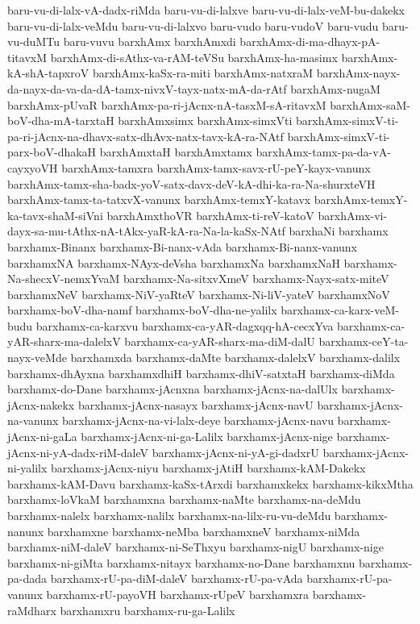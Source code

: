 {baru-vu-di-lalx-vA-dadx-riMda
baru-vu-di-lalxve
baru-vu-di-lalx-veM-bu-dakekx
baru-vu-di-lalx-veMdu
baru-vu-di-lalxvo
baru-vudo
baru-vudoV
baru-vudu
baru-vu-duMTu
baru-vuvu
barxhAmx
barxhAmxdi
barxhAmx-di-ma-dhayx-pA-titavxM
barxhAmx-di-sAthx-va-rAM-teVSu
barxhAmx-ha-masimx
barxhAmx-kA-shA-tapxroV
barxhAmx-kaSx-ra-miti
barxhAmx-natxraM
barxhAmx-nayx-da-nayx-da-va-da-dA-tamx-nivxV-tayx-natx-mA-da-rAtf
barxhAmx-nugaM
barxhAmx-pUvaR
barxhAmx-pa-ri-jAcnx-nA-tasxM-sA-ritavxM
barxhAmx-saM-boV-dha-mA-tarxtaH
barxhAmxsimx
barxhAmx-simxVti
barxhAmx-simxV-ti-pa-ri-jAcnx-na-dhavx-satx-dhAvx-natx-tavx-kA-ra-NAtf
barxhAmx-simxV-ti-parx-boV-dhakaH
barxhAmxtaH
barxhAmxtamx
barxhAmx-tamx-pa-da-vA-cayxyoVH
barxhAmx-tamxra
barxhAmx-tamx-savx-rU-peY-kayx-vanunx
barxhAmx-tamx-sha-badx-yoV-satx-davx-deV-kA-dhi-ka-ra-Na-shurxteVH
barxhAmx-tamx-ta-tatxvX-vanunx
barxhAmx-temxY-katavx
barxhAmx-temxY-ka-tavx-shaM-siVni
barxhAmxthoVR
barxhAmx-ti-reV-katoV
barxhAmx-vi-dayx-sa-mu-tAthx-nA-tAkx-yaR-kA-ra-Na-la-kaSx-NAtf
barxhaNi
barxhamx
barxhamx-Binanx
barxhamx-Bi-nanx-vAda
barxhamx-Bi-nanx-vanunx
barxhamxNA
barxhamx-NAyx-deVsha
barxhamxNa
barxhamxNaH
barxhamx-Na-shecxV-nemxYvaM
barxhamx-Na-sitxvXmeV
barxhamx-Nayx-satx-miteV
barxhamxNeV
barxhamx-NiV-yaRteV
barxhamx-Ni-liV-yateV
barxhamxNoV
barxhamx-boV-dha-namf
barxhamx-boV-dha-ne-yalilx
barxhamx-ca-karx-veM-budu
barxhamx-ca-karxvu
barxhamx-ca-yAR-dagxqq-hA-cecxYva
barxhamx-ca-yAR-sharx-ma-dalelxV
barxhamx-ca-yAR-sharx-ma-diM-dalU
barxhamx-ceY-ta-nayx-veMde
barxhamxda
barxhamx-daMte
barxhamx-dalelxV
barxhamx-dalilx
barxhamx-dhAyxna
barxhamxdhiH
barxhamx-dhiV-satxtaH
barxhamx-diMda
barxhamx-do-Dane
barxhamx-jAcnxna
barxhamx-jAcnx-na-dalUlx
barxhamx-jAcnx-nakekx
barxhamx-jAcnx-nasayx
barxhamx-jAcnx-navU
barxhamx-jAcnx-na-vanunx
barxhamx-jAcnx-na-vi-lalx-deye
barxhamx-jAcnx-navu
barxhamx-jAcnx-ni-gaLa
barxhamx-jAcnx-ni-ga-Lalilx
barxhamx-jAcnx-nige
barxhamx-jAcnx-ni-yA-dadx-riM-daleV
barxhamx-jAcnx-ni-yA-gi-dadxrU
barxhamx-jAcnx-ni-yalilx
barxhamx-jAcnx-niyu
barxhamx-jAtiH
barxhamx-kAM-Dakekx
barxhamx-kAM-Davu
barxhamx-kaSx-tArxdi
barxhamxkekx
barxhamx-kikxMtha
barxhamx-loVkaM
barxhamxna
barxhamx-naMte
barxhamx-na-deMdu
barxhamx-nalelx
barxhamx-nalilx
barxhamx-na-lilx-ru-vu-deMdu
barxhamx-nanunx
barxhamxne
barxhamx-neMba
barxhamxneV
barxhamx-niMda
barxhamx-niM-daleV
barxhamx-ni-SeThxyu
barxhamx-nigU
barxhamx-nige
barxhamx-ni-giMta
barxhamx-nitayx
barxhamx-no-Dane
barxhamxnu
barxhamx-pa-dada
barxhamx-rU-pa-diM-daleV
barxhamx-rU-pa-vAda
barxhamx-rU-pa-vanunx
barxhamx-rU-payoVH
barxhamx-rUpeV
barxhamxra
barxhamx-raMdharx
barxhamxru
barxhamx-ru-ga-Lalilx
}

